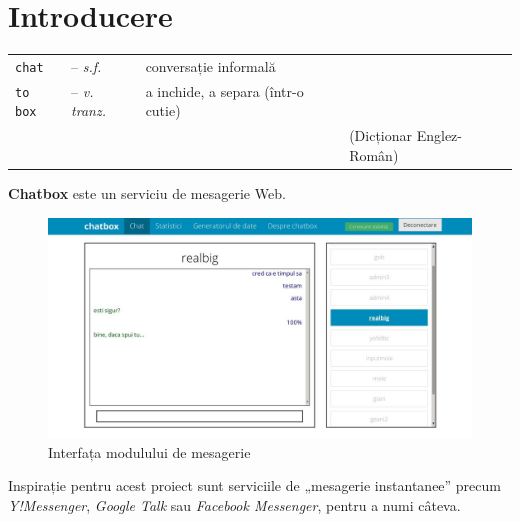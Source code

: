 \documentclass[12pt,a4paper]{article}
\begin{document}


\newpage
\section{Introducere}


\hspace{-26px}
\begin{tabular}{l l l l}
\texttt{chat} & --  \textit{s.f.} & conversație informală &\\
\texttt{to box} & --  \textit{v. tranz.} & a inchide, a separa (într-o cutie)&\\
& & & (Dicționar Englez-Român)\\ %
\end{tabular}

\vfill
{\large \textbf{Chatbox} este un serviciu de mesagerie Web.}

\begin{figure}[h]
	\centering
	\includegraphics[width=150mm]{img/over.jpg}
	\vspace{-15px}
	\caption{Interfața modulului de mesagerie}
	\vspace{-15px}
	\label{fig:overview}
\end{figure}

\vspace{3mm}
Inspirație pentru acest proiect sunt serviciile de „mesagerie instantanee”
precum \textit{Y!Messenger}, \textit{Google Talk} sau 
\textit{Facebook Messenger}, pentru a numi câteva.
\end{document}
